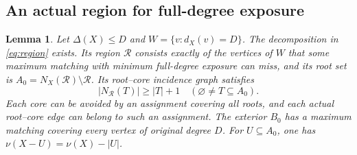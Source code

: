 \documentclass[11pt,a4paper]{article}
\newtheorem{lemma}[theorem]{Lemma}
\theoremstyle{definition}
\begin{document}
\subsection{An actual region for full-degree exposure}
\begin{lemma}\label{lem:intrinsic-region}
Let $\Delta(X)\le D$ and $W=\{v:d_X(v)=D\}$. The decomposition in \eqref{eq:region} exists. Its region $\mathcal R$ consists exactly of the vertices of $W$ that some maximum matching with minimum full-degree exposure can miss, and its root set is $A_0=N_X(\mathcal R)\setminus\mathcal R$. Its root--core incidence graph satisfies
\[
 |N_{\mathcal R}(T)|\ge |T|+1\quad(\varnothing\ne T\subseteq A_0).
\]
Each core can be avoided by an assignment covering all roots, and each actual root--core edge can belong to such an assignment. The exterior $B_0$ has a maximum matching covering every vertex of original degree $D$. For $U\subseteq A_0$, one has $\nu(X-U)=\nu(X)-|U|$.
\end{lemma}
\end{document}
